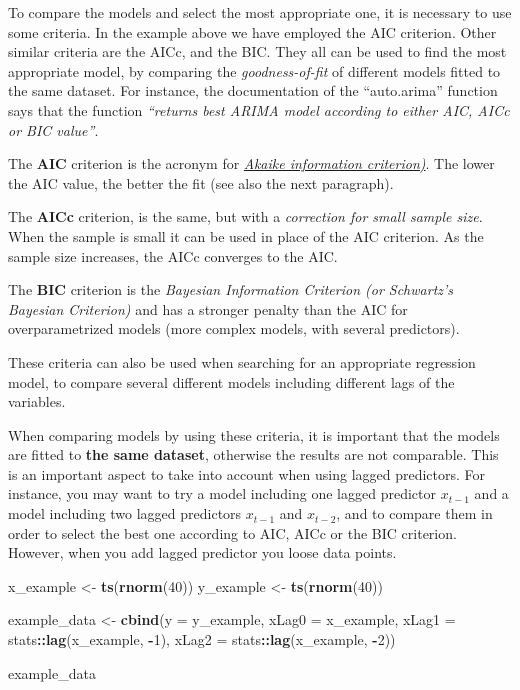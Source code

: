 \documentclass[
]{article}
\newenvironment{Shaded}{\begin{snugshade}}{\end{snugshade}}
\newcommand{\AttributeTok}[1]{\textcolor[rgb]{0.13,0.29,0.53}{#1}}
\newcommand{\DecValTok}[1]{\textcolor[rgb]{0.00,0.00,0.81}{#1}}
\newcommand{\FunctionTok}[1]{\textcolor[rgb]{0.13,0.29,0.53}{\textbf{#1}}}
\newcommand{\NormalTok}[1]{#1}
\newcommand{\OtherTok}[1]{\textcolor[rgb]{0.56,0.35,0.01}{#1}}
\newcommand{\SpecialCharTok}[1]{\textcolor[rgb]{0.81,0.36,0.00}{\textbf{#1}}}
\begin{document}
To compare the models and select the most appropriate one, it is necessary to use some criteria. In the example above we have employed the AIC criterion. Other similar criteria are the AICc, and the BIC. They all can be used to find the most appropriate model, by comparing the \emph{goodness-of-fit} of different models fitted to the same dataset. For instance, the documentation of the ``auto.arima'' function says that the function \emph{``returns best ARIMA model according to either AIC, AICc or BIC value''}.

The \textbf{AIC} criterion is the acronym for \href{https://en.wikipedia.org/wiki/Akaike_information_criterion}{\emph{Akaike information criterion)}}. The lower the AIC value, the better the fit (see also the next paragraph).

The \textbf{AICc} criterion, is the same, but with a \emph{correction for small sample size}. When the sample is small it can be used in place of the AIC criterion. As the sample size increases, the AICc converges to the AIC.

The \textbf{BIC} criterion is the \emph{Bayesian Information Criterion (or Schwartz's Bayesian Criterion)} and has a stronger penalty than the AIC for overparametrized models (more complex models, with several predictors).

These criteria can also be used when searching for an appropriate regression model, to compare several different models including different lags of the variables.

When comparing models by using these criteria, it is important that the models are fitted to \textbf{the same dataset}, otherwise the results are not comparable. This is an important aspect to take into account when using lagged predictors. For instance, you may want to try a model including one lagged predictor \(x_{t-1}\) and a model including two lagged predictors \(x_{t-1}\) and \(x_{t-2}\), and to compare them in order to select the best one according to AIC, AICc or the BIC criterion. However, when you add lagged predictor you loose data points.

\begin{Shaded}
\begin{Highlighting}[]
\NormalTok{x\_example }\OtherTok{\textless{}{-}} \FunctionTok{ts}\NormalTok{(}\FunctionTok{rnorm}\NormalTok{(}\DecValTok{40}\NormalTok{))}
\NormalTok{y\_example }\OtherTok{\textless{}{-}} \FunctionTok{ts}\NormalTok{(}\FunctionTok{rnorm}\NormalTok{(}\DecValTok{40}\NormalTok{))}

\NormalTok{example\_data }\OtherTok{\textless{}{-}} \FunctionTok{cbind}\NormalTok{(}\AttributeTok{y =}\NormalTok{ y\_example,}
                      \AttributeTok{xLag0 =}\NormalTok{ x\_example,}
                      \AttributeTok{xLag1 =}\NormalTok{ stats}\SpecialCharTok{::}\FunctionTok{lag}\NormalTok{(x\_example, }\SpecialCharTok{{-}}\DecValTok{1}\NormalTok{),}
                      \AttributeTok{xLag2 =}\NormalTok{ stats}\SpecialCharTok{::}\FunctionTok{lag}\NormalTok{(x\_example, }\SpecialCharTok{{-}}\DecValTok{2}\NormalTok{))}

\NormalTok{example\_data}
\end{Highlighting}
\end{Shaded}
\end{document}

